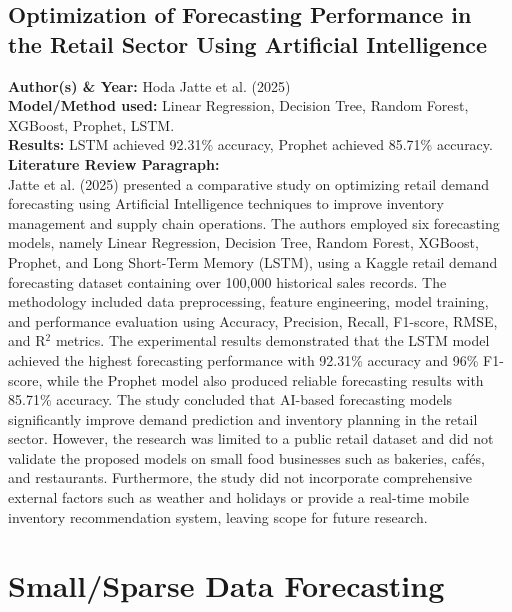 \documentclass[conference]{IEEEtran}
\begin{document}
\subsection{Optimization of Forecasting Performance in the Retail Sector Using Artificial Intelligence}
\textbf{Author(s) \& Year:} Hoda Jatte et al. (2025)\\
\textbf{Model/Method used:} Linear Regression, Decision Tree, Random Forest, XGBoost, Prophet, LSTM.\\
\textbf{Results:} LSTM achieved 92.31\% accuracy, Prophet achieved 85.71\% accuracy.\\
\textbf{Literature Review Paragraph:}\\
Jatte et al. (2025) presented a comparative study on optimizing retail demand forecasting using Artificial Intelligence techniques to improve inventory management and supply chain operations. The authors employed six forecasting models, namely Linear Regression, Decision Tree, Random Forest, XGBoost, Prophet, and Long Short-Term Memory (LSTM), using a Kaggle retail demand forecasting dataset containing over 100,000 historical sales records. The methodology included data preprocessing, feature engineering, model training, and performance evaluation using Accuracy, Precision, Recall, F1-score, RMSE, and R$^2$ metrics. The experimental results demonstrated that the LSTM model achieved the highest forecasting performance with 92.31\% accuracy and 96\% F1-score, while the Prophet model also produced reliable forecasting results with 85.71\% accuracy. The study concluded that AI-based forecasting models significantly improve demand prediction and inventory planning in the retail sector. However, the research was limited to a public retail dataset and did not validate the proposed models on small food businesses such as bakeries, cafés, and restaurants. Furthermore, the study did not incorporate comprehensive external factors such as weather and holidays or provide a real-time mobile inventory recommendation system, leaving scope for future research.

\section{Small/Sparse Data Forecasting}
\end{document}
